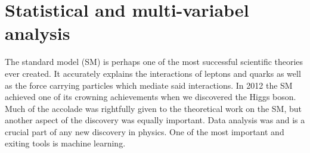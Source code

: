 \chapter{Statistical and multi-variabel analysis}

The standard model (SM) is perhaps one of the most successful scientific theories ever created. It accurately explains the interactions of leptons and quarks as well as the force carrying particles which mediate said interactions. In 2012 the SM achieved one of its crowning achievements when we discovered the Higgs boson. Much of the accolade was rightfully given to the theoretical work on the SM, but another aspect of the discovery was equally important. Data analysis was and is a crucial part of any new discovery in physics. One of the most important and exiting tools is machine learning.